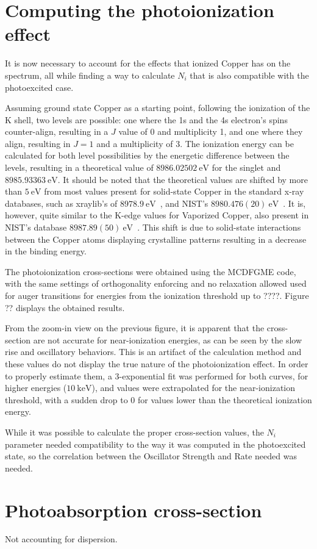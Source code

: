 \section{Computing the photoionization effect}

It is now necessary to account for the effects that ionized Copper has on the spectrum, all while finding a way to calculate $N_i$ that is also compatible with the photoexcited case.


Assuming ground state Copper as a starting point, following the ionization of the K shell, two levels are possible: one where the 1s and the 4s electron's spins counter-align, resulting in a $J$ value of 0 and multiplicity 1, and one where they align, resulting in $J=1$ and a multiplicity of 3. The ionization energy can be calculated for both level possibilities by the energetic difference between the levels, resulting in a theoretical value of $8986.02502\ \si{\electronvolt}$ for the singlet and $8985.93363\ \si{\electronvolt}$. It should be noted that the theoretical values are shifted by more than $5\ \si{\electronvolt}$ from most values present for solid-state Copper in the standard x-ray databases, such as xraylib's of $8978.9\ \si{\electronvolt}$~\cite{SCHOONJANS2011776}, and NIST's $ 8 980.476(20) \ \si{\electronvolt}$~\cite{NIST_database}. It is, however, quite similar to the K-edge values for Vaporized Copper, also present in NIST's database $8 987.89(50)\ \si{\electronvolt}$~\cite{NIST_database}. This shift is due to solid-state interactions between the Copper atoms displaying crystalline patterns  resulting in a decrease in the binding energy.


The photoionization cross-sections were obtained using the \gls{MCDFGME} code,  with the same settings of orthogonality enforcing and no relaxation allowed used for auger transitions for energies from the ionization threshold up to ????. Figure ?? displays the obtained results.


From the zoom-in view on the previous figure, it is apparent that the cross-section are not accurate for near-ionization energies, as can be seen by the slow rise and oscillatory behaviors. This is an artifact of the calculation method and these values do not display the true nature of the photoionization effect. In order to properly estimate them, a 3-exponential fit was performed for both curves, for higher energies ($10\ \si{\kilo\electronvolt}$), and values were extrapolated for the near-ionization threshold, with a sudden drop to 0 for values lower than the theoretical ionization energy.


While it was possible to calculate the proper cross-section values, the $N_i$ parameter needed compatibility to the way it was computed in the photoexcited state, so the correlation between the Oscillator Strength and Rate needed was needed.

\section{Photoabsorption cross-section}
Not accounting for dispersion.